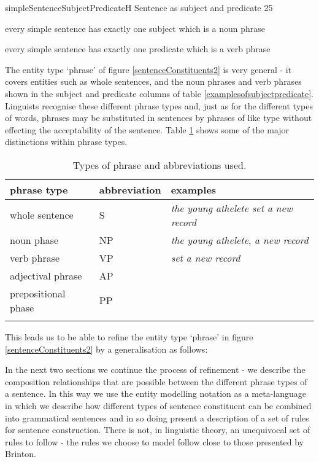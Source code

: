 \begin{erbulletedDimFig}{simpleSentenceSubjectPredicate}{H} {Sentence as subject and predicate} {2}{5}
\item {every simple sentence has exactly one subject which is a noun phrase}
\item {every simple sentence has exactly one predicate which is a verb phrase}
\end {erbulletedDimFig}
%
\FloatBarrier
\noindent The entity type `phrase' of figure \ref{sentenceConstituents2} is very general 
- it covers entities such as whole sentences, and the noun phrases and verb phrases shown in the subject and predicate columns of table \ref{examplesofsubjectpredicate}. Linguists recognise these different phrase types and, just as for the different types of words, phrases may be substituted in sentences by phrases of like type without effecting the acceptability of the sentence. Table \ref{tableofphrasetypes} shows some of the major distinctions within phrase types. 
\begin{longtable} {l l l}
phrase type    & abbreviation& examples \\
\hline
whole sentence &      S      &   \textit{the young athelete set a new record}\\
noun phase     &      NP     &   \textit{the young athelete}, \textit{a new record}\\
verb phrase    &      VP     &   \textit{set a new record}\\
adjectival phrase &   AP &   \\
prepositional phase & PP  &   \\
\caption{Types of phrase and abbreviations used.}
\label {tableofphrasetypes}
\end{longtable}
\noindent This leads us to be able to refine  the entity type `phrase' in figure \ref{sentenceConstituents2} by a generalisation as follows: 
\begin{center}

\end{center}

\noindent  In the next two sections we continue the process of refinement - we describe the composition relationships that are possible between the different phrase types of a sentence. In this way we use the
entity modelling notation as a meta-language in which we describe how different types of sentence constituent can be combined into grammatical sentences and in so doing present a
description of a set of rules for sentence construction. There is not, in linguistic theory, an unequivocal set of rules to follow  - the rules we choose to model follow close to those presented by Brinton. 
\newpage
